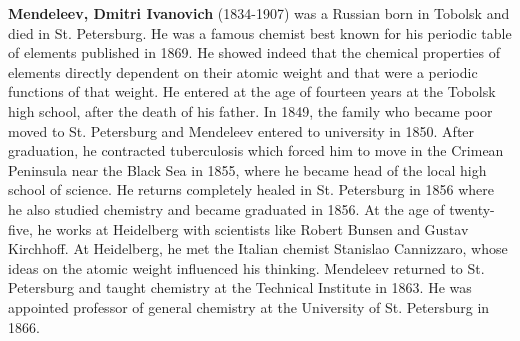\textbf{Mendeleev, Dmitri Ivanovich} (1834-1907) was a Russian born in Tobolsk and died in St. Petersburg. He was a famous chemist best known for his periodic table of elements published in 1869. He showed indeed that the chemical properties of elements directly dependent on their atomic weight and that were a periodic functions of that weight. He entered at the age of fourteen years at the Tobolsk high school, after the death of his father. In 1849, the family who became poor moved to St. Petersburg and Mendeleev entered to university in 1850. After graduation, he contracted tuberculosis which forced him to move in the Crimean Peninsula near the Black Sea in 1855, where he became head of the local high school of science. He returns completely healed in St. Petersburg in 1856 where he also studied chemistry and became graduated in 1856. At the age of twenty-five, he works at Heidelberg with scientists like Robert Bunsen and Gustav Kirchhoff. At Heidelberg, he met the Italian chemist Stanislao Cannizzaro, whose ideas on the atomic weight influenced his thinking. Mendeleev returned to St. Petersburg and taught chemistry at the Technical Institute in 1863. He was appointed professor of general chemistry at the University of St. Petersburg in 1866.

